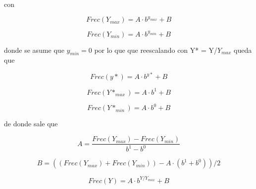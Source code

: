 \documentclass{article}
\begin{document}
    con 
    
    \begin{equation*}
        Frec(Y_{max}) = A \cdot b^{y_{max}} + B
    \end{equation*}
    
    \begin{equation*}
        Frec(Y_{min}) = A \cdot b^{y_{min}} + B
    \end{equation*}
    
    donde se asume que $y_{min}=0$ por lo que que reescalando con Y* = Y/$Y_{max}$ queda que
    
    \begin{equation*}
        Frec(y*) = A \cdot b^{y*} + B
    \end{equation*}
    
    \begin{equation*}
        Frec(Y*_{max}) = A \cdot b^{1} + B
    \end{equation*}
    
    \begin{equation*}
        Frec(Y*_{min}) = A \cdot b^{0} + B
    \end{equation*}
    
    de donde sale que 
    
    \begin{equation}
        \label{ec:yToF1}
        A = \frac{Frec(Y_{max}) - Frec(Y_{min}) }{b^1-b^0}
    \end{equation}
    
    \begin{equation}
        \label{ec:yToF2}
        B = ((Frec(Y_{max}) + Frec(Y_{min})) - A \cdot (b^1 + b^0)) / 2
    \end{equation}
    
    \begin{equation}
        \label{ec:yToF3}
        Frec(Y) = A \cdot b^{Y/Y_{max}} + B
    \end{equation}
\clearpage
\end{document}
